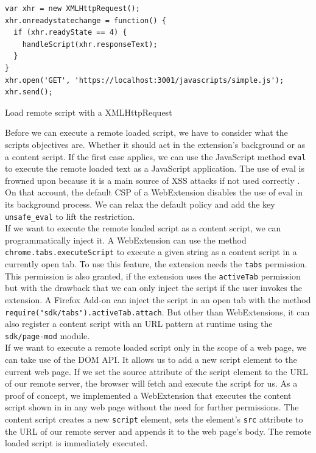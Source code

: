 			\begin{code}
				\begin{lstlisting}
var xhr = new XMLHttpRequest();
xhr.onreadystatechange = function() {
  if (xhr.readyState == 4) {
    handleScript(xhr.responseText);
  }
}
xhr.open('GET', 'https://localhost:3001/javascripts/simple.js');
xhr.send();
				\end{lstlisting}
				\caption{Load remote script with a XMLHttpRequest}
				\label{xhrLoadScript}
			\end{code}
			
			Before we can execute a remote loaded script, we have to consider what the scripts objectives are. Whether it should act in the extension's background or as a content script. If the first case applies, we can use the JavaScript method \texttt{eval} to execute the remote loaded text as a JavaScript application. The use of eval is frowned upon because it is a main source of XSS attacks if not used correctly \cite{mozillaDangerousEval}. On that account, the default CSP of a WebExtension disables the use of eval in its background process. We can relax the default policy and add the key \texttt{unsafe\_eval} to lift the restriction. \\
			
			If we want to execute the remote loaded script as a content script, we can programmatically inject it. A WebExtension can use the method \texttt{chrome.tabs.executeScript} to execute a given string as a content script in a currently open tab. To use this feature, the extension needs the \texttt{tabs} permission. This permission is also granted, if the extension uses the \texttt{activeTab} permission but with the drawback that we can only inject the script if the user invokes the extension. A Firefox Add-on can inject the script in an open tab with the method \texttt{require("sdk/tabs").activeTab.attach}. But other than WebExtensions, it can also register a content script with an URL pattern at runtime using the \texttt{sdk/page-mod} module. \\
			
			If we want to execute a remote loaded script only in the scope of a web page, we can take use of the DOM API. It allows us to add a new script element to the current web page. If we set the source attribute of the script element to the URL of our remote server, the browser will fetch and execute the script for us. As a proof of concept, we  implemented a WebExtension that executes the content script shown in  in any web page without the need for further permissions. The content script creates a new \texttt{script} element, sets the element's \texttt{src} attribute to the URL of our remote server and appends it to the web page's body. The remote loaded script is immediately executed.
			
